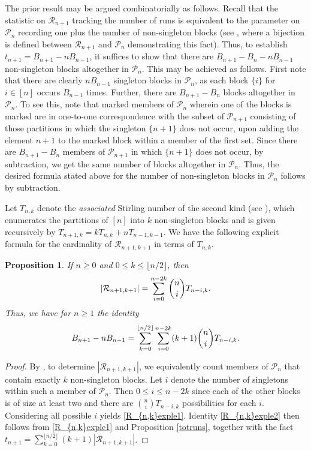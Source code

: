 \documentclass[11pt,a4paper]{article}
\newtheorem{proposition}{Proposition}[section]
\begin{document}
The prior result may be argued combinatorially as follows.  Recall that the statistic on $\mathcal{R}_{n+1}$ tracking the number of runs is equivalent to the parameter on $\mathcal{P}_n$ recording one plus the number of non-singleton blocks (see \cite{NRB}, where a bijection is defined between $\mathcal{R}_{n+1}$ and $\mathcal{P}_n$ demonstrating this fact).  Thus, to establish $t_{n+1}=B_{n+1}-nB_{n-1}$, it suffices to show that there are $B_{n+1}-B_n-nB_{n-1}$ non-singleton blocks altogether in $\mathcal{P}_n$.  This may be achieved as follows.  First note that there are clearly $nB_{n-1}$ singleton blocks in $\mathcal{P}_n$, as each block $\{i\}$ for $i \in [n]$ occurs $B_{n-1}$ times.  Further, there are $B_{n+1}-B_n$ blocks altogether in $\mathcal{P}_n$.  To see this, note that marked members of $\mathcal{P}_n$ wherein one of the blocks is marked are in one-to-one correspondence with the subset of $\mathcal{P}_{n+1}$ consisting of those partitions in which the singleton $\{n+1\}$ does not occur, upon adding the element $n+1$ to the marked block within a member of the first set.  Since there are $B_{n+1}-B_n$ members of $\mathcal{P}_{n+1}$ in which $\{n+1\}$ does not occur, by subtraction, we get the same number of blocks altogether in $\mathcal{P}_n$.  Thus, the desired formula stated above for the number of non-singleton blocks in $\mathcal{P}_n$ follows by subtraction.

Let $T_{n,k}$ denote the \emph{associated} Stirling number of the second kind (see \cite[A008299]{Sl}), which enumerates the partitions of $[n]$ into $k$ non-singleton blocks and is given recursively by $T_{n+1,k}=kT_{n,k}+nT_{n-1,k-1}$.  We have the following explicit formula for the cardinality of $\mathcal{R}_{n+1,k+1}$ in terms of $T_{n,k}$.

\begin{proposition}\label{R_{n,k}expl}
If $n \geq 0$ and $0 \leq k \leq \lfloor n/2 \rfloor$, then
\begin{equation}\label{R_{n,k}exple1}
|\mathcal{R}_{n+1,k+1}|=\sum_{i=0}^{n-2k}\binom{n}{i}T_{n-i,k}.
\end{equation}
Thus, we have for $n \geq 1$ the identity
\begin{equation}\label{R_{n,k}exple2}
B_{n+1}-nB_{n-1}=\sum_{k=0}^{\lfloor n/2 \rfloor}\sum_{i=0}^{n-2k}(k+1)\binom{n}{i}T_{n-i,k}.
\end{equation}
\end{proposition}
\begin{proof}
By \cite[Theorem 19]{NRB}, to determine $|\mathcal{R}_{n+1,k+1}|$, we equivalently count members of $\mathcal{P}_n$ that contain exactly $k$ non-singleton blocks. Let $i$ denote the number of singletons within such a member of $\mathcal{P}_n$.  Then $0 \leq i \leq n-2k$ since each of the other blocks is of size at least two and there are $\binom{n}{i}T_{n-i,k}$ possibilities for each $i$. Considering all possible $i$ yields \eqref{R_{n,k}exple1}.  Identity \eqref{R_{n,k}exple2} then follows from \eqref{R_{n,k}exple1} and Proposition \ref{totruns}, together with the fact $t_{n+1}=\sum_{k=0}^{\lfloor n/2 \rfloor}(k+1)|\mathcal{R}_{n+1,k+1}|$.
\end{proof}
\end{document}
